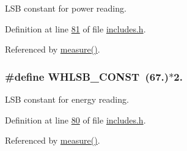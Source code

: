L\-S\-B constant for power reading. 



Definition at line \hyperlink{a00037_source_l00081}{81} of file \hyperlink{a00037_source}{includes.\-h}.



Referenced by \hyperlink{a00042_source_l00040}{measure()}.

\hypertarget{a00037_a75a052821a52067f93124e0c7ddcfdc3}{
\subsubsection[{W\-H\-L\-S\-B\-\_\-\-C\-O\-N\-S\-T}]{\setlength{\rightskip}{0pt plus 5cm}\#define W\-H\-L\-S\-B\-\_\-\-C\-O\-N\-S\-T~(67.)$\ast$2.}}\label{d1/dc6/a00037_a75a052821a52067f93124e0c7ddcfdc3}


L\-S\-B constant for energy reading. 



Definition at line \hyperlink{a00037_source_l00080}{80} of file \hyperlink{a00037_source}{includes.\-h}.



Referenced by \hyperlink{a00042_source_l00040}{measure()}.

